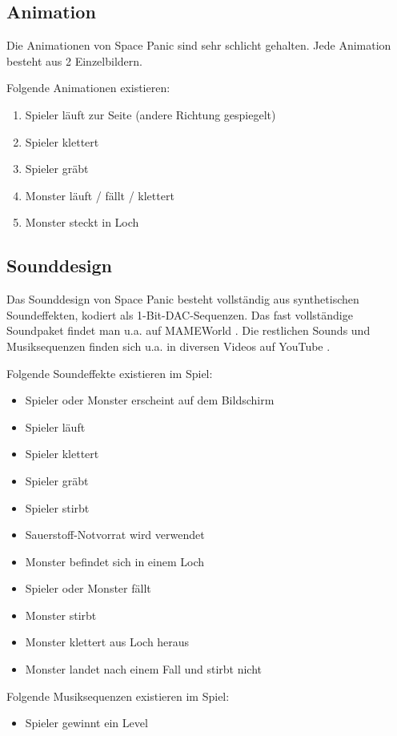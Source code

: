 \documentclass[12pt]{article}
\begin{document}


\subsection{Animation}
Die Animationen von Space Panic sind sehr schlicht gehalten. Jede Animation besteht aus 2 Einzelbildern.

Folgende Animationen existieren:
\begin{enumerate}
\item Spieler läuft zur Seite (andere Richtung gespiegelt)
\item Spieler klettert
\item Spieler gräbt
\item Monster läuft / fällt / klettert
\item Monster steckt in Loch
\end{enumerate}

    
\subsection{Sounddesign}
Das Sounddesign von Space Panic besteht vollständig aus synthetischen Soundeffekten, kodiert als 1-Bit-DAC-Sequenzen. Das fast vollständige Soundpaket findet man u.a. auf MAMEWorld \cite[panic.zip]{mameworld:samples}. Die restlichen Sounds und Musiksequenzen finden sich u.a. in diversen Videos auf YouTube \cite{youtube:spacepanic1}.

Folgende Soundeffekte existieren im Spiel:
\begin{itemize}
\item Spieler oder Monster erscheint auf dem Bildschirm
\item Spieler läuft
\item Spieler klettert
\item Spieler gräbt
\item Spieler stirbt
\item Sauerstoff-Notvorrat wird verwendet
\item Monster befindet sich in einem Loch
\item Spieler oder Monster fällt
\item Monster stirbt
\item Monster klettert aus Loch heraus
\item Monster landet nach einem Fall und stirbt nicht
\end{itemize}

Folgende Musiksequenzen existieren im Spiel:
\begin{itemize}
\item Spieler gewinnt ein Level
\end{itemize}
\end{document}
